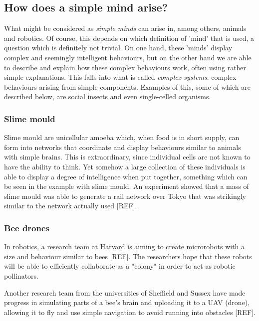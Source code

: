 \documentclass[11pt]{article}
\newenvironment{draft}{\color{dark-cornflower-blue-2}}{\ignorespacesafterend}
\begin{document}
\subsection{How does a simple mind arise?}
\begin{draft}

What might be considered as \textit{simple minds} can arise in, among others, animals and robotics. Of course, this depends on which definition of 'mind' that is used, a question which is definitely not trivial. On one hand, these 'minds' display complex and seemingly intelligent behaviours, but on the other hand we are able to describe and explain how these complex behaviours work, often using rather simple explanations. This falls into what is called \textit{complex systems}: complex behaviours arising from simple components. Examples of this, some of which are described below, are social insects and even single-celled organisms.

\subsubsection*{Slime mould}

Slime mould are unicellular amoeba which, when food is in short supply, can form into networks that coordinate and display behaviours similar to animals with simple brains. This is extraordinary, since individual cells are not known to have the ability to think. Yet somehow a large collection of these individuals is able to display a degree of intelligence when put together, something which can be seen in the example with slime mould. An experiment showed that a mass of slime mould was able to generate a rail network over Tokyo that was strikingly similar to the network actually used [REF]. 

\subsubsection*{Bee drones}

In robotics, a research team at Harvard is aiming to create microrobots with a size and behaviour similar to bees [REF]. The researchers hope that these robots will be able to efficiently collaborate as a "colony" in order to act as robotic pollinators.

Another research team from the universities of Sheffield and Sussex have made progress in simulating parts of a bee's brain and uploading it to a UAV (drone), allowing it to fly and use simple navigation to avoid running into obstacles [REF].

\end{draft}
\end{document}
